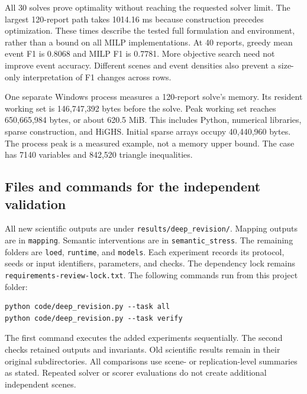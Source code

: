 All 30 solves prove optimality without reaching the requested solver limit. The largest 120-report path takes 1014.16 ms because construction precedes optimization. These times describe the tested full formulation and environment, rather than a bound on all MILP implementations. At 40 reports, greedy mean event F1 is 0.8068 and MILP F1 is 0.7781. More objective search need not improve event accuracy. Different scenes and event densities also prevent a size-only interpretation of F1 changes across rows.

One separate Windows process measures a 120-report solve's memory. Its resident working set is 146,747,392 bytes before the solve. Peak working set reaches 650,665,984 bytes, or about 620.5 MiB. This includes Python, numerical libraries, sparse construction, and HiGHS. Initial sparse arrays occupy 40,440,960 bytes. The process peak is a measured example, not a memory upper bound. The case has 7140 variables and 842,520 triangle inequalities.

\subsection{Files and commands for the independent validation}
All new scientific outputs are under \texttt{results/deep\_revision/}. Mapping outputs are in \texttt{mapping}. Semantic interventions are in \texttt{semantic\_stress}. The remaining folders are \texttt{loed}, \texttt{runtime}, and \texttt{models}. Each experiment records its protocol, seeds or input identifiers, parameters, and checks. The dependency lock remains \texttt{requirements-review-lock.txt}. The following commands run from this project folder:
\begin{verbatim}
python code/deep_revision.py --task all
python code/deep_revision.py --task verify
\end{verbatim}
The first command executes the added experiments sequentially. The second checks retained outputs and invariants. Old scientific results remain in their original subdirectories. All comparisons use scene- or replication-level summaries as stated. Repeated solver or scorer evaluations do not create additional independent scenes.
